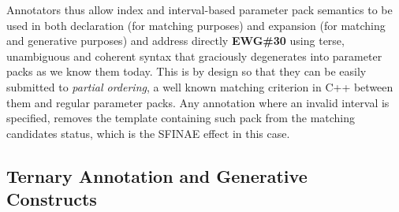

\p Annotators thus allow index and interval-based parameter pack semantics to be used in both declaration (for matching purposes) and expansion (for matching and generative purposes) and address directly \textbf{EWG\#30} \cite{Abrahams2012} using terse, unambiguous and coherent syntax that graciously degenerates into parameter packs as we know them today.
This is by design so that they can be easily submitted to \textit{partial ordering}, a well known matching criterion in C++ between them and regular parameter packs.
Any annotation where an invalid interval is specified, removes the template containing such pack from the matching candidates status, which is the SFINAE \cite{sfinae} effect in this case.

\subsection{Ternary Annotation and Generative Constructs}
    
        
